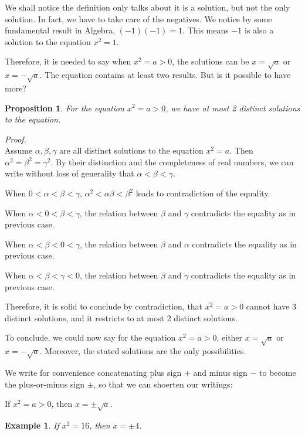 \documentclass[12pt]{article}
\newtheorem*{proposition}{Proposition}
\newtheorem*{example}{Example}
\renewenvironment{proof}[1][Proof]{\begin{snugshade*} \textit{{#1}.}\\}{\hfill \qedsymbol \end{snugshade*}}
\begin{document}
    We shall notice the definition only talks about it is a solution, but not the only solution. In fact, we have to take care of the negatives. We notice by some fundamental result in Algebra, $(-1)(-1)=1$. This means $-1$ is also a solution to the equation $x^2=1$.

    Therefore, it is needed to say when $x^2=a>0$, the solutions can be $x=\sqrt{a}$ or $x=-\sqrt{a}$. The equation contains at least two results. But is it possible to have more?

    \begin{proposition}
        For the equation $x^2=a>0$, we have at most 2 distinct solutions to the equation. 
    \end{proposition}

    \begin{proof}
        Assume $\alpha,\beta,\gamma$ are all distinct solutions to the equation $x^2=a$. Then $\alpha^2=\beta^2=\gamma^2$. By their distinction and the completeness of real numbers, we can write without loss of generality that $\alpha<\beta<\gamma$.

        When $0<\alpha<\beta<\gamma$, $\alpha^2<\alpha\beta<\beta^2$ leads to contradiction of the equality.

        When $\alpha<0<\beta<\gamma$, the relation between $\beta$ and $\gamma$ contradicts the equality as in previous case.

        When $\alpha<\beta<0<\gamma$, the relation between $\beta$ and $\alpha$ contradicts the equality as in previous case.

        When $\alpha<\beta<\gamma<0$, the relation between $\beta$ and $\gamma$ contradicts the equality as in previous case.

        Therefore, it is solid to conclude by contradiction, that $x^2=a>0$ cannot have 3 distinct solutions, and it restricts to at most 2 distinct solutions.
    \end{proof}

    To conclude, we could now say for the equation $x^2=a>0$, either $x=\sqrt{a}$ or $x=-\sqrt{a}$. Moreover, the stated solutions are the only possibilities.

    We write for convenience concatenating plus sign $+$ and minus sign $-$ to become the plus-or-minus sign $\pm$, so that we can shoerten our writings:

    If $x^2=a>0$, then $x=\pm \sqrt{a}$.
    
    \begin{example}
        If $x^2=16$, then $x=\pm 4$.
    \end{example}
\end{document}
